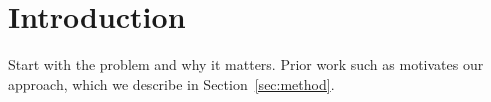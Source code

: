 \section{Introduction}
\label{sec:intro}

Start with the problem and why it matters. Prior work such as
\cite{vaswani2017attention} motivates our approach, which we describe in
Section~\ref{sec:method}.
